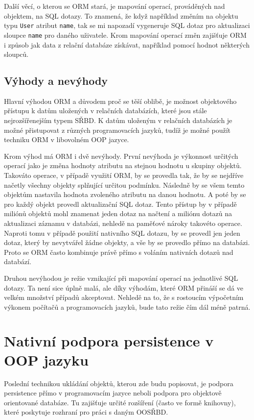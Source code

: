 Další věcí, o kterou se ORM stará, je mapování operací, prováděných nad objektem, na SQL dotazy. To znamená, že když například změním na objektu typu \texttt{User} atribut \texttt{name}, tak se mi napozadí vygeneruje SQL dotaz pro aktualizaci sloupce \texttt{name} pro daného uživatele. Krom mapování operací změn zajišťuje ORM i způsob jak data z relační databáze získávat, například pomocí hodnot některých sloupců.
\subsection{Výhody a nevýhody}
Hlavní výhodou ORM a důvodem proč se těší oblibě, je možnost objektového přístupu k datům uložených v relačních databázích, které jsou stále nejrozšířenejším typem SŘBD. K datům uloženým v relačních databázích je možné přistupovat z různých programovacích jazyků, tudíž je možné použít techniku ORM v libovolném OOP jazyce.

Krom výhod má ORM i dvě nevýhody. První nevýhoda je výkonnost určitých operací jako je změna hodnoty atributu na stejnou hodnotu u skupiny objektů. Takováto operace, v případě využití ORM, by se provedla tak, že by se nejdříve načetly všechny objekty splňující určitou podmínku. Následně by se všem temto objektům nastavila hodnota zvoleného atributu na danou hodnotu. A poté by se pro každý objekt provedl aktualizační SQL dotaz. Tento přístup by v případě miliónů objektů mohl znamenat jeden dotaz na načtení a miliónu dotazů na aktualizaci záznamu v databázi, nehledě na paměťové nároky takovéto operace. Naproti tomu v případě použití nativního SQL dotazu, by se provedl jen jeden dotaz, který by nevytvářel žádne objekty, a vše by se provedlo přímo na databázi. Proto se ORM často kombinuje právě přímo s voláním nativních dotazů nad databází.

Druhou nevýhodou je režie vznikající při mapování operací na jednotlivé SQL dotazy. Ta není sice úplně malá, ale díky výhodám, které ORM přináší se dá ve velkém množství případů akceptovat. Nehledě na to, že s rostoucím výpočetním výkonem počítačů a programovacích jazyků, bude tato režie čím dál méně patrná.

\section{Nativní podpora persistence v OOP jazyku}
Poslední technikou ukládání objektů, kterou zde budu popisovat, je podpora persistence přímo v programovacím jazyce neboli podpora pro objektově orientované databáze. Tu zajišťuje určité rozšíření (často ve formě knihovny), které poskytuje rozhraní pro práci s daným OOSŘBD.

